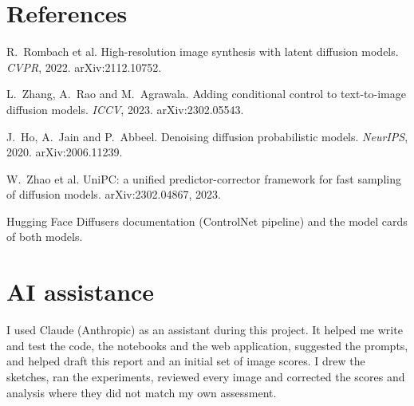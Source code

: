 \documentclass[10pt,a4paper]{article}
\begin{document}
\section*{References}
\small
\begin{enumerate}[label={[\arabic*]}]
  \item R.~Rombach et al. High-resolution image synthesis with latent diffusion models. \emph{CVPR}, 2022. arXiv:2112.10752.
  \item L.~Zhang, A.~Rao and M.~Agrawala. Adding conditional control to text-to-image diffusion models. \emph{ICCV}, 2023. arXiv:2302.05543.
  \item J.~Ho, A.~Jain and P.~Abbeel. Denoising diffusion probabilistic models. \emph{NeurIPS}, 2020. arXiv:2006.11239.
  \item W.~Zhao et al. UniPC: a unified predictor-corrector framework for fast sampling of diffusion models. arXiv:2302.04867, 2023.
  \item Hugging Face Diffusers documentation (ControlNet pipeline) and the model cards of both models.
\end{enumerate}

\normalsize
\section*{AI assistance}
I used Claude (Anthropic) as an assistant during this project. It helped me write and test the code, the notebooks and the web application, suggested the prompts, and helped draft this report and an initial set of image scores. I drew the sketches, ran the experiments, reviewed every image and corrected the scores and analysis where they did not match my own assessment.
\end{document}
